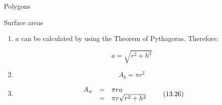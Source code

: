 \begin{exercises}{Polygons}
\begin{exercises}{Surface areas }
{\begin{mdframed}[linewidth=4, leftmargin=40, rightmargin=40]
\begin{exercise}
\begin{enumerate}[noitemsep, label=\textbf{Step} \textbf{\arabic*}. ]
    \setcounter{subfigure}{0}


	\begin{figure}[H] %
    \begin{center}
    \label{m39357*id62779!!!underscore!!!media}\label{m39357*id62779!!!underscore!!!printimage}\texttt{[image: col11306.imgs/m39357\_MG11C16\_003.png]} %
        
      \vspace{2pt}
    \vspace{.1in}
    
    \end{center}

 \end{figure}   

    \addtocounter{footnote}{-0}
    
      \par 
      \label{m39357*id62785}This curved surface can be cut into many thin triangles with height close to $a$ ($a$ is called the \textsl{slant height}). The area of these triangles will add up to $\frac{1}{2}\ensuremath{\times}$base$\ensuremath{\times}$height(of a small triangle) which is $\frac{1}{2}\ensuremath{\times}2\pi r\ensuremath{\times}a=\pi ra$\par 
      \item  
      \label{m39357*id62881}$a$ can be calculated by using the Theorem of Pythagoras. Therefore:\par 
      \label{m39357*id62892}\nopagebreak\noindent{}
        
    \begin{equation}
    a=\sqrt{{r}^{2}+{h}^{2}}\tag{13.24}
      \end{equation}
    
      
      \item  
      \label{m39357*id62928}\nopagebreak\noindent{}
        
    \begin{equation}
    {A}_{b}=\pi {r}^{2}\tag{13.25}
      \end{equation}
    
      
      \item  
      \label{m39357*id62960}\nopagebreak\noindent{}
        
    \begin{equation}
    \begin{array}{ccc}\hfill {A}_{w}& =& \pi ra\hfill \\ & =& \pi r\sqrt{{r}^{2}+{h}^{2}}\hfill \end{array}\tag{13.26}
      \end{equation}
    

\end{enumerate}
\end{exercise}
\end{mdframed}}
\end{exercises}
\end{exercises}
